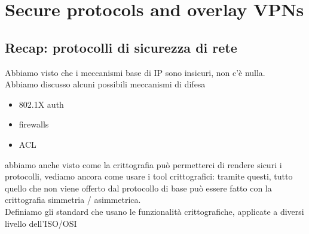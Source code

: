 \documentclass[12pt, oneside]{extbook} %
\begin{document}
\chapter*{Secure protocols and overlay VPNs}

\section{Recap: protocolli di sicurezza di rete}
Abbiamo visto che i meccanismi base di IP sono insicuri, non c'è nulla.
\\Abbiamo discusso alcuni possibili meccanismi di difesa
\begin{itemize}
    \item 802.1X auth
    \item firewalls
    \item ACL
\end{itemize}
abbiamo anche visto come la crittografia può permetterci di rendere sicuri i protocolli, vediamo ancora come usare i tool crittografici: tramite questi, tutto quello che non viene offerto dal protocollo di base può essere fatto con la crittografia simmetria / asimmetrica.
\\Definiamo gli standard che usano le funzionalità crittografiche, applicate a diversi livello dell'ISO/OSI
\end{document}
